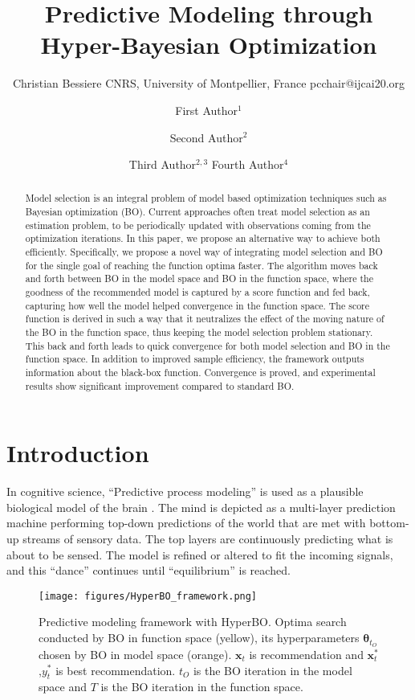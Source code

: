 \documentclass{article}
\title{Predictive Modeling through Hyper-Bayesian Optimization}
\author{
    Christian Bessiere
    \affiliations
    CNRS, University of Montpellier, France
    \emails
    pcchair@ijcai20.org
}
\author{
First Author$^1$
\and
Second Author$^2$\and
Third Author$^{2,3}$\And
Fourth Author$^4$
\iffalse
\affiliations
$^1$First Affiliation\\
$^2$Second Affiliation\\
$^3$Third Affiliation\\
$^4$Fourth Affiliation
\emails
\{first, second\}@example.com,
third@other.example.com,
fourth@example.com
\fi
}
\begin{document}
\maketitle

\begin{abstract}
	Model selection is an integral problem of model based optimization techniques such as Bayesian optimization (BO). Current approaches often treat model selection as an estimation problem, to be periodically updated with observations coming from the optimization iterations. In this paper, we propose an alternative way to achieve both efficiently. Specifically, we propose a novel way of integrating model selection and BO for the single goal of reaching the function optima faster. The algorithm moves back and forth between BO in the model space and BO in the function space, where the goodness of the recommended model is captured by a score function and fed back, capturing how well the model helped convergence in the function space. The score function is derived in such a way that it neutralizes the effect of the moving nature of the BO in the function space, thus keeping the model selection problem stationary. This back and forth leads to quick convergence for both model selection and BO in the function space. In addition to improved sample efficiency, the framework outputs information about the black-box function. Convergence is proved, and experimental results show significant improvement compared to standard BO.
\end{abstract}
\section{Introduction}
In cognitive science, “Predictive process modeling” is used as a plausible biological model of the brain \cite{Clark2013,Clark2015a}. The  mind is depicted as a multi-layer prediction machine performing top-down predictions of the world that are met with bottom-up streams of sensory data.  The top layers are continuously predicting what is about to be sensed. The model is refined or altered to fit the incoming signals, and this “dance” continues until “equilibrium” is reached. 

\begin{figure}[!tb]
	\begin{center}
		\texttt{[image: figures/HyperBO\_framework.png]}
	\end{center}
	\caption{Predictive modeling framework with HyperBO. Optima search conducted by BO in function space (yellow), its hyperparameters $\boldsymbol{\theta}_{t_{O}}$ chosen by BO in model space (orange).  $\boldsymbol{x}_{t}$ is recommendation and $\boldsymbol{x}^{*}_{t}$,$y^{*}_{t}$ is best recommendation. $t_O$ is the BO iteration in the model space and $T$ is the BO iteration in the function space.}
	\label{fig:HyerBO_framework}
\end{figure}
\end{document}
